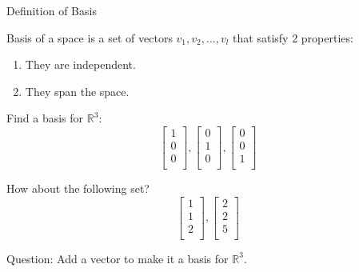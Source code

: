 \documentclass{beamer}
\begin{document}
\begin{frame}{Definition of Basis}
\begin{definition}
Basis of a space is a set of vectors $v_1,v_2,...,v_l$ that satisfy 2 properties:
\begin{enumerate}
    \item They are independent.
    \item They span the space.
\end{enumerate}
\end{definition}

\vspace{3pt}
Find a basis for $\mathbb{R}^3$:
\begin{equation*}
    \left[ \begin{array}{c}
        1\\
        0\\
        0\\
    \end{array} \right] , \left[ \begin{array}{c}
        0\\
        1\\
        0\\
    \end{array} \right] , \left[ \begin{array}{c}
        0\\
        0\\
        1\\
    \end{array} \right]
\end{equation*}

How about the following set?
\begin{equation*}
    \left[ \begin{array}{c}
        1\\
        1\\
        2\\
    \end{array} \right] , \left[ \begin{array}{c}
        2\\
        2\\
        5\\
    \end{array} \right]
\end{equation*}

Question: Add a vector to make it a basis for $\mathbb{R}^3$.
\end{frame}
\end{document}
